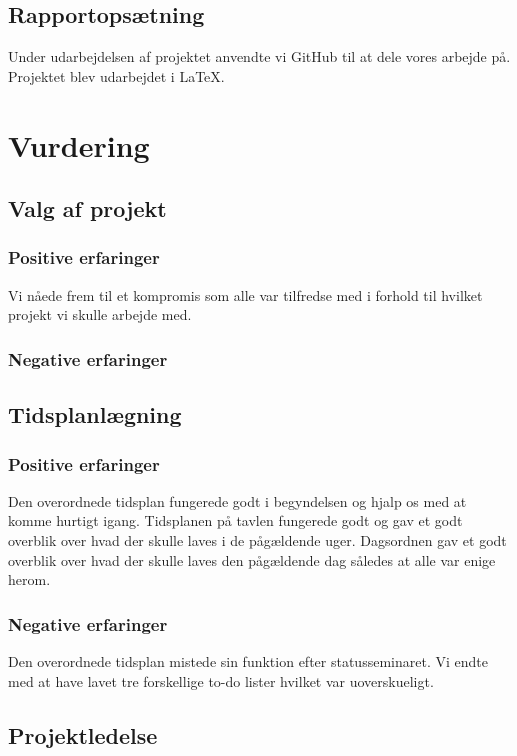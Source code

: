 \subsection{Rapportopsætning}
Under udarbejdelsen af projektet anvendte vi GitHub til at dele vores arbejde på. Projektet blev udarbejdet i LaTeX. 

\section{Vurdering}

\subsection{Valg af projekt}

\subsubsection{Positive erfaringer}
Vi nåede frem til et kompromis som alle var tilfredse med i forhold til hvilket projekt vi skulle arbejde med.
\subsubsection{Negative erfaringer}

\subsection{Tidsplanlægning}

\subsubsection{Positive erfaringer}
Den overordnede tidsplan fungerede godt i begyndelsen og hjalp os med at komme hurtigt igang. Tidsplanen på tavlen fungerede godt og gav et godt overblik over hvad der skulle laves i de pågældende uger. Dagsordnen gav et godt overblik over hvad der skulle laves den pågældende dag således at alle var enige herom. 

\subsubsection{Negative erfaringer}
Den overordnede tidsplan mistede sin funktion efter statusseminaret. Vi endte med at have lavet tre forskellige to-do lister hvilket var uoverskueligt.

\subsection{Projektledelse}

